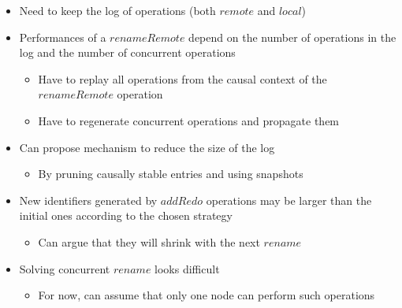 \documentclass[a4paper]{article}
\begin{document}
\begin{itemize}
  \item Need to keep the log of operations (both $remote$ and $local$)
  \item Performances of a $renameRemote$ depend on the number of operations in the log and the number of concurrent operations
  \begin{itemize}
    \item Have to replay all operations from the causal context of the $renameRemote$ operation
    \item Have to regenerate concurrent operations and propagate them
  \end{itemize}
  \item Can propose mechanism to reduce the size of the log
  \begin{itemize}
    \item By pruning causally stable entries and using snapshots
  \end{itemize}
  \item New identifiers generated by $addRedo$ operations may be larger than the initial ones according to the chosen strategy
  \begin{itemize}
    \item Can argue that they will shrink with the next $rename$
  \end{itemize}
  \item Solving concurrent $rename$ looks difficult
  \begin{itemize}
    \item For now, can assume that only one node can perform such operations
  \end{itemize}
\end{itemize}


\end{document}
